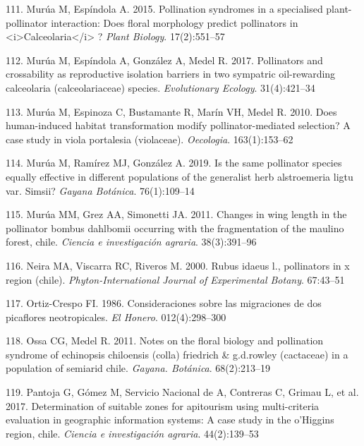 \documentclass[
]{article}
\begin{document}
\leavevmode\hypertarget{ref-RN142}{}%
111. Murúa M, Espíndola A. 2015. Pollination syndromes in a specialised
plant-pollinator interaction: Does floral morphology predict pollinators
in \textless i\textgreater Calceolaria\textless/i\textgreater{} ?
\emph{Plant Biology}. 17(2):551--57

\leavevmode\hypertarget{ref-RN57}{}%
112. Murúa M, Espíndola A, González A, Medel R. 2017. Pollinators and
crossability as reproductive isolation barriers in two sympatric
oil-rewarding calceolaria (calceolariaceae) species. \emph{Evolutionary
Ecology}. 31(4):421--34

\leavevmode\hypertarget{ref-RN143}{}%
113. Murúa M, Espinoza C, Bustamante R, Marín VH, Medel R. 2010. Does
human-induced habitat transformation modify pollinator-mediated
selection? A case study in viola portalesia (violaceae).
\emph{Oecologia}. 163(1):153--62

\leavevmode\hypertarget{ref-RN58}{}%
114. Murúa M, Ramírez MJ, González A. 2019. Is the same pollinator
species equally effective in different populations of the generalist
herb alstroemeria ligtu var. Simsii? \emph{Gayana Botánica}.
76(1):109--14

\leavevmode\hypertarget{ref-RN56}{}%
115. Murúa MM, Grez AA, Simonetti JA. 2011. Changes in wing length in
the pollinator bombus dahlbomii occurring with the fragmentation of the
maulino forest, chile. \emph{Ciencia e investigación agraria}.
38(3):391--96

\leavevmode\hypertarget{ref-RN95}{}%
116. Neira MA, Viscarra RC, Riveros M. 2000. Rubus idaeus l.,
pollinators in x region (chile). \emph{Phyton-International Journal of
Experimental Botany}. 67:43--51

\leavevmode\hypertarget{ref-RN89}{}%
117. Ortiz-Crespo FI. 1986. Consideraciones sobre las migraciones de dos
picaflores neotropicales. \emph{El Honero}. 012(4):298--300

\leavevmode\hypertarget{ref-RN145}{}%
118. Ossa CG, Medel R. 2011. Notes on the floral biology and pollination
syndrome of echinopsis chiloensis (colla) friedrich \& g.d.rowley
(cactaceae) in a population of semiarid chile. \emph{Gayana. Botánica}.
68(2):213--19

\leavevmode\hypertarget{ref-RN59}{}%
119. Pantoja G, Gómez M, Servicio Nacional de A, Contreras C, Grimau L,
et al. 2017. Determination of suitable zones for apitourism using
multi-criteria evaluation in geographic information systems: A case
study in the o'Higgins region, chile. \emph{Ciencia e investigación
agraria}. 44(2):139--53
\end{document}
